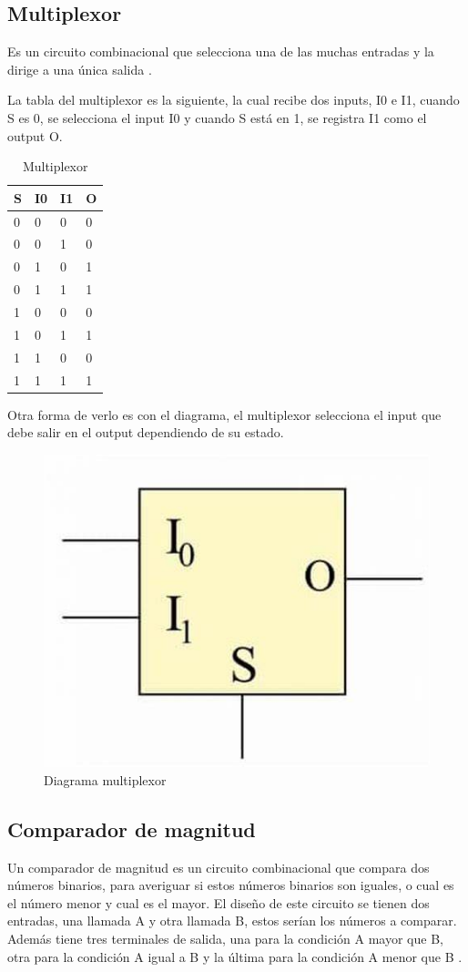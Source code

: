 \documentclass[12pt]{article}  %
\begin{document}
\subsection*{Multiplexor}
Es un circuito combinacional que selecciona una de las muchas entradas y la dirige a una única salida \cite{7944062}.

La tabla del multiplexor es la siguiente, la cual recibe dos inputs, I0 e I1, cuando S es 0, se selecciona el input I0 y cuando S está en 1, se registra I1 como el output O.

\begin{table}[!ht]
    \centering
    \caption{Multiplexor}
    \begin{tabular}{|l|l|l|l|}
    \hline
        S & I0 & I1 & O \\ \hline
        0 & 0 & 0 & 0 \\ \hline
        0 & 0 & 1 & 0 \\ \hline
        0 & 1 & 0 & 1 \\ \hline
        0 & 1 & 1 & 1 \\ \hline
        1 & 0 & 0 & 0 \\ \hline
        1 & 0 & 1 & 1 \\ \hline
        1 & 1 & 0 & 0 \\ \hline
        1 & 1 & 1 & 1 \\ \hline
    \end{tabular}
\end{table}

Otra forma de verlo es con el diagrama, el multiplexor selecciona el input que debe salir en el output dependiendo de su estado.

\begin{figure}[!ht]
    \centering
    \caption{Diagrama multiplexor}
    \includegraphics[width=0.25\linewidth]{Imagenes/Schemes/multiplexor.jpg}
\end{figure}

\subsection*{Comparador de magnitud}

Un comparador de magnitud es un circuito combinacional que compara dos números binarios, para averiguar si estos números binarios son iguales, o cual es el número menor y cual es el mayor. El diseño de este circuito se tienen dos entradas, una llamada A y otra llamada B, estos serían los números a comparar. Además tiene tres terminales de salida, una para la condición A mayor que B, otra para la condición A igual a B y la última para la condición A menor que B \cite{ComparadorDeMagnitud}. 
\end{document}
